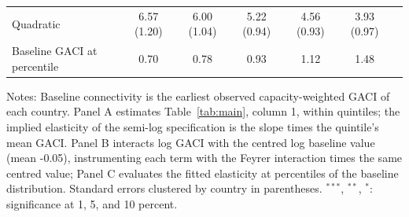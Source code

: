 \documentclass[12pt]{article}
\begin{document}
\begin{table}[H]
{\begin{threeparttable}
\begin{tabular}{lcccccc}
  Quadratic & 6.57 (1.20) & 6.00 (1.04) & 5.22 (0.94) & 4.56 (0.93) & 3.93 (0.97) & \\
  Baseline GACI at percentile & 0.70 & 0.78 & 0.93 & 1.12 & 1.48 & \\
\bottomrule
\end{tabular}
\begin{tablenotes}[flushleft]
\footnotesize
\item Notes: Baseline connectivity is the earliest observed capacity-weighted GACI of each country. Panel A estimates Table~\ref{tab:main}, column 1, within quintiles; the implied elasticity of the semi-log specification is the slope times the quintile's mean GACI. Panel B interacts log GACI with the centred log baseline value (mean -0.05), instrumenting each term with the Feyrer interaction times the same centred value; Panel C evaluates the fitted elasticity at percentiles of the baseline distribution. Standard errors clustered by country in parentheses. $^{***}$, $^{**}$, $^{*}$: significance at 1, 5, and 10 percent.
\end{tablenotes}
\end{threeparttable}}
\end{table}
\end{document}
